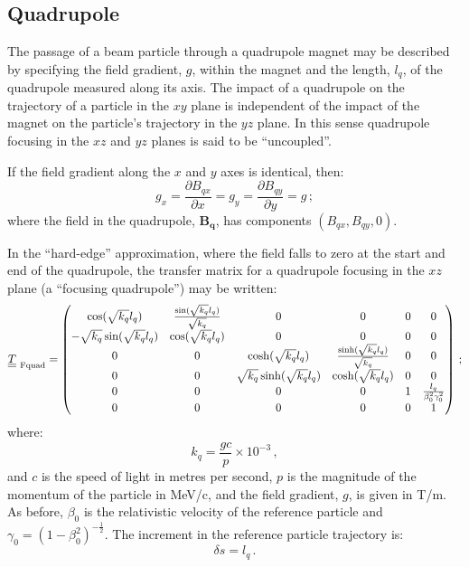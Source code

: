 \subsection{Quadrupole}

The passage of a beam particle through a quadrupole magnet may be
described by specifying the field gradient, $g$, within the magnet and
the length, $l_q$, of the quadrupole measured along its axis.
The impact of a quadrupole on the trajectory of a particle in the $xy$
plane is independent of the impact of the magnet on the particle's
trajectory in the $yz$ plane.   
In this sense quadrupole focusing in the $xz$ and $yz$ planes is said
to be ``uncoupled''. 

If the field gradient along the $x$ and $y$ axes is identical, then:
\begin{equation}
  g_x = \frac{\partial B_{qx}}{\partial x} =
  g_y = \frac{\partial B_{qy}}{\partial y} = g \, ; 
\end{equation}
where the field in the quadrupole, $\bm{B_q}$, has components
$(B_{qx}, B_{qy}, 0)$.

In the ``hard-edge'' approximation, where the field falls to zero at
the start and end of the quadrupole, the transfer matrix for a
quadrupole focusing in the $xz$ plane (a ``focusing quadrupole'') may
be written: 
\begin{equation}
  \underline{\underline{T}}_{\rm~Fquad} =
    \begin{pmatrix}
          \cos(\sqrt{k_q} l_q) & \frac{\sin(\sqrt{k_q} l_q)}{\sqrt{k_q}} & 0 & 0             & 0 & 0 \\
-\sqrt{k_q} \sin(\sqrt{k_q} l_q) &                  \cos(\sqrt{k_q} l_q) & 0 & 0             & 0 & 0 \\
          0 & 0 &           \cosh(\sqrt{k_q} l_q) & \frac{\sinh(\sqrt{k_q} l_q)}{\sqrt{k_q}} & 0 & 0 \\
          0 & 0 &  \sqrt{k_q} \sinh(\sqrt{k_q} l_q) &                  \cosh(\sqrt{k_q} l_q) & 0 & 0 \\
          0 & 0 & 0 & 0 & 1 & \frac{l_q}{\beta_0^2 \gamma_0^2} \\
          0 & 0 & 0 & 0 & 0 &                             1
        \end{pmatrix} \, ; 
\end{equation}
where:
\begin{equation}
  k_q = \frac{gc}{p} \times 10^{-3} \, ,  \label{Eq:Effectivekq}
\end{equation}
and $c$ is the speed of light in metres per second, $p$ is the
magnitude of the momentum of the particle in MeV/c, and the field
gradient, $g$, is given in T/m.
As before, $\beta_0$ is the relativistic velocity of the reference
particle and $\gamma_0=(1-\beta_0^2)^{-\frac{1}{2}}$.
The increment in the reference particle trajectory is:
\begin{equation}
  \delta s = l_q \, .
\end{equation}

